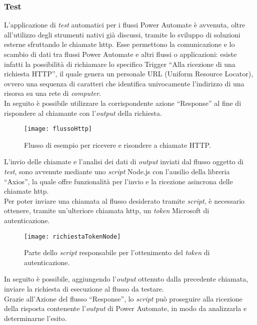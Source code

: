 \subsubsection*{Test}
\label{testProgrammazione}
L'applicazione di \emph{test} automatici per i flussi Power Automate è avvenuta, oltre all'utilizzo degli strumenti nativi già discussi, tramite lo sviluppo di soluzioni esterne sfruttando le chiamate \gls{http}.
Esse permettono la comunicazione e lo scambio di dati tra flussi Power Automate e altri flussi o applicazioni: esiste infatti la possibilità di richiamare lo specifico Trigger “Alla ricezione di una richiesta HTTP”, il quale genera un personale URL (Uniform Resource Locator), ovvero una sequenza di caratteri che identifica univocamente l'indirizzo di una risorsa su una rete di \emph{computer}.\\
In seguito è possibile utilizzare la corrispondente azione “Response” al fine di rispondere al chiamante con l'\emph{output} della richiesta.\\
\begin{figure}[htbp] 
    \centering 
    \texttt{[image: flussoHttp]} 
    \caption{Flusso di esempio per ricevere e risondere a chiamate HTTP.}
    \label{fig:flussoHttp}
\end{figure}
\newline L'invio delle chiamate e l'analisi dei dati di \emph{output} inviati dal flusso oggetto di \emph{test}, sono avvenute mediante uno \emph{script} Node.js con l'ausilio della libreria “Axios”, la quale offre funzionalità per l'invio e la ricezione asincrona delle chiamate \gls{http}.\\
Per poter inviare una chiamata al flusso desiderato tramite \emph{script}, è necessario ottenere, tramite un'ulteriore chiamata \gls{http}, un \emph{token} Microsoft di autenticazione.
\begin{figure}[htbp] 
    \centering 
    \texttt{[image: richiestaTokenNode]} 
    \caption{Parte dello \emph{script} responsabile per l'ottenimento del \emph{token} di autenticazione.}
    \label{fig:richiestaTokenNode}
\end{figure}
\newline In seguito è possibile, aggiungendo l'\emph{output} ottenuto dalla precedente chiamata, inviare la richiesta di esecuzione al flusso da testare.\\
Grazie all'Azione del flusso “Response”, lo \emph{script} può proseguire alla ricezione della risposta contenente l'\emph{output} di Power Automate, in modo da analizzarla e determinarne l'esito.
